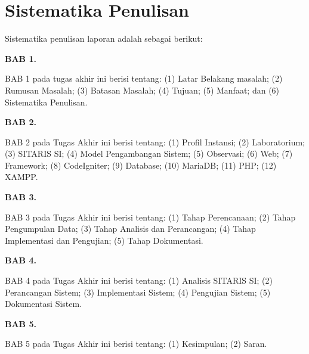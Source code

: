 \section{Sistematika Penulisan}
Sistematika penulisan laporan adalah sebagai berikut:

\textbf{BAB 1. \babSatu}

BAB 1 pada tugas akhir ini berisi tentang: (1) Latar Belakang masalah; (2) Rumusan Masalah; (3) Batasan Masalah; (4) Tujuan; (5) Manfaat; dan (6) Sistematika Penulisan.

\textbf{BAB 2. \babDua}

BAB 2 pada Tugas Akhir ini berisi tentang: (1) Profil Instansi; (2) Laboratorium; (3) SITARIS SI; (4) Model Pengambangan Sistem; (5) Observasi; (6) Web; (7) Framework; (8) CodeIgniter; (9) Database; (10) MariaDB; (11) PHP; (12) XAMPP.

\textbf{BAB 3. \babTiga}

BAB 3 pada Tugas Akhir ini berisi tentang: (1) Tahap Perencanaan; (2) Tahap Pengumpulan Data; (3) Tahap Analisis dan Perancangan; (4) Tahap Implementasi dan Pengujian; (5) Tahap Dokumentasi.

\textbf{BAB 4. \babEmpat}

BAB 4 pada Tugas Akhir ini berisi tentang: (1) Analisis SITARIS SI; (2) Perancangan Sistem; (3) Implementasi Sistem; (4) Pengujian Sistem; (5) Dokumentasi Sistem.

\textbf{BAB 5. \babLima}

BAB 5 pada Tugas Akhir ini berisi tentang: (1) Kesimpulan; (2) Saran.
